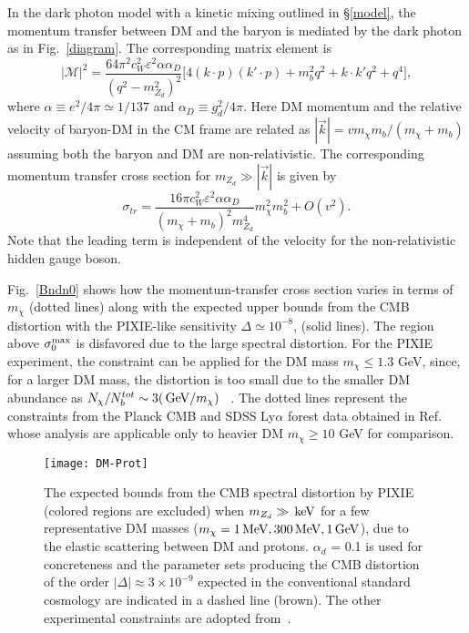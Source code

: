 \documentclass[5p,times]{elsarticle}
\newcommand\gev{\,{\rm GeV}}
\newcommand\mev{\,{\rm MeV}}
\newcommand\kev{\,{\rm keV}}
\begin{document}
In the dark photon model with a kinetic mixing outlined in \S \ref{model}, the momentum transfer between DM and the baryon is mediated by the dark photon as in Fig.~\ref{diagram}.  The corresponding matrix element is
\begin{equation} \label{eq:msq}
|\mathcal{M}|^2=\frac{64\pi^2c_W^2\varepsilon^2\alpha\alpha_D}{(q^2-m_{Z_d}^2)^2}\Big[4(k\cdot p)(k'\cdot p)+m_b^2q^2+k\cdot k'q^2+q^4\Big], \end{equation}
where $\alpha\equiv e^2/4\pi \simeq 1/137$ and $\alpha_D \equiv g_d^2/4\pi$.
Here DM momentum and the relative velocity of baryon-DM in the CM frame are related as  $|\vec{k}|=v m_\chi m_b/(m_\chi+m_b)$
assuming both the baryon and DM are non-relativistic.
The corresponding momentum transfer cross section  for  $m_{Z_d}\gg|\vec{k}|$ is given by
\begin{equation}
\sigma_{tr}=\frac{16\pi c_W^2\varepsilon^2\alpha\alpha_D}{(m_\chi+m_b)^2m_{Z_d}^4}m_\chi^2 m_b^2+ O(v^2).
\end{equation}
Note that the leading term is independent of the velocity for the non-relativistic hidden gauge boson.


Fig.~\ref{Bndn0} shows how the momentum-transfer cross section varies in terms of $m_\chi$  (dotted lines) along with the expected upper bounds from the CMB distortion with the PIXIE-like sensitivity $\Delta \simeq 10^{-8}$, (solid lines). The region above $\sigma_0^{\rm max}$ is disfavored due to the large spectral distortion. For the PIXIE experiment, the constraint can be applied for the DM mass $m_\chi \le 1.3$ GeV, since, for a larger DM mass, the distortion is too small due to the smaller DM abundance as $N_\chi/N_b^{tot} \sim 3 (\gev/m_\chi)$ ~\cite{Ali-Haimoud:2015pwa}.
The dotted lines represent the constraints from the Planck CMB and SDSS Ly$\alpha$ forest data obtained in Ref.~\cite{Dvorkin:2013cea} whose analysis are applicable only to heavier DM $m_\chi \ge 10$ GeV for comparison.

\begin{figure} [t!]
\centering
\texttt{[image: DM-Prot]}
\caption{The expected  bounds from the CMB spectral distortion by PIXIE (colored regions are excluded) when $m_{Z_d}\gg \kev$ for a few representative DM masses ($m_\chi=1 \mev, 300\mev, 1 \gev$), due to the elastic scattering between DM and protons. $\alpha_d$ = 0.1 is used for concreteness and the parameter sets producing the CMB distortion of the order $|\Delta|\approx 3 \times 10^{-9}$ expected in the conventional standard cosmology are indicated in a dashed line (brown). The other experimental constraints are adopted from~\cite{Alekhin:2015byh}.}
\label{protonDM}
\end{figure}
\end{document}
